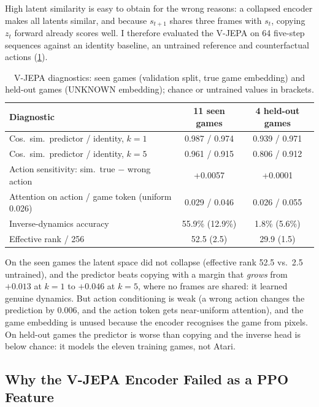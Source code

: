 \documentclass[runningheads]{llncs}
\begin{document}
High latent similarity is easy to obtain for the wrong reasons: a collapsed encoder makes all
latents similar, and because $s_{t+1}$ shares three frames with $s_t$, copying $z_t$ forward
already scores well. I therefore evaluated the V-JEPA on 64 five-step sequences against an
identity baseline, an untrained reference and counterfactual actions (\cref{tab:jepa}).

\begin{table}[t]
\centering
\caption{V-JEPA diagnostics: seen games (validation split, true game embedding) and held-out
games (UNKNOWN embedding); chance or untrained values in brackets.}
\label{tab:jepa}
\footnotesize\setlength{\tabcolsep}{4pt}
\begin{tabular}{@{}lcc@{}}
\toprule
Diagnostic & 11 seen games & 4 held-out games \\
\midrule
Cos.\ sim.\ predictor / identity, $k=1$ & 0.987 / 0.974 & 0.939 / 0.971 \\
Cos.\ sim.\ predictor / identity, $k=5$ & 0.961 / 0.915 & 0.806 / 0.912 \\
Action sensitivity: sim.\ true $-$ wrong action & +0.0057 & +0.0001 \\
Attention on action / game token (uniform 0.026) & 0.029 / 0.046 & 0.026 / 0.055 \\
Inverse-dynamics accuracy & 55.9\% (12.9\%) & 1.8\% (5.6\%) \\
Effective rank / 256 & 52.5 (2.5) & 29.9 (1.5) \\
\bottomrule
\end{tabular}
\end{table}

On the seen games the latent space did not collapse (effective rank 52.5 vs.\ 2.5
untrained), and the predictor beats copying with a margin that \emph{grows} from $+0.013$ at
$k=1$ to $+0.046$ at $k=5$, where no frames are shared: it learned genuine dynamics. But action
conditioning is weak (a wrong action changes the prediction by 0.006, and the action token gets
near-uniform attention), and the game embedding is unused because the encoder recognises the
game from pixels. On held-out games the predictor is worse than copying and the inverse head is
below chance: it models the eleven training games, not Atari.

\subsection{Why the V-JEPA Encoder Failed as a PPO Feature}
\label{sec:jepa-fail}
\end{document}
